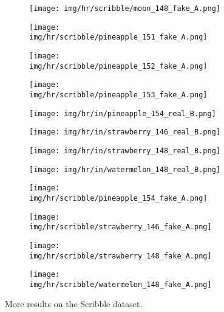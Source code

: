 \documentclass[10pt,twocolumn,letterpaper]{article}
\begin{document}
\begin{figure*}[tbp]
\begin{center}
\begin{subfigure}[b]{\hrwidth\linewidth}
  \texttt{[image: img/hr/scribble/moon\_148\_fake\_A.png]}
  \end{subfigure}
  \begin{subfigure}[b]{\hrwidth\linewidth}
  \texttt{[image: img/hr/scribble/pineapple\_151\_fake\_A.png]}
  \end{subfigure}
\begin{subfigure}[b]{\hrwidth\linewidth}
  \texttt{[image: img/hr/scribble/pineapple\_152\_fake\_A.png]}
  \end{subfigure}
  \begin{subfigure}[b]{\hrwidth\linewidth}
  \texttt{[image: img/hr/scribble/pineapple\_153\_fake\_A.png]}
  \end{subfigure}
  
\begin{subfigure}[b]{\hrwidth\linewidth}
  \texttt{[image: img/hr/in/pineapple\_154\_real\_B.png]}
  \end{subfigure}
  \begin{subfigure}[b]{\hrwidth\linewidth}
  \texttt{[image: img/hr/in/strawberry\_146\_real\_B.png]}
  \end{subfigure}
\begin{subfigure}[b]{\hrwidth\linewidth}
  \texttt{[image: img/hr/in/strawberry\_148\_real\_B.png]}
  \end{subfigure}
  \begin{subfigure}[b]{\hrwidth\linewidth}
  \texttt{[image: img/hr/in/watermelon\_148\_real\_B.png]}
  \end{subfigure}
  
\begin{subfigure}[b]{\hrwidth\linewidth}
  \texttt{[image: img/hr/scribble/pineapple\_154\_fake\_A.png]}
  \end{subfigure}
  \begin{subfigure}[b]{\hrwidth\linewidth}
  \texttt{[image: img/hr/scribble/strawberry\_146\_fake\_A.png]}
  \end{subfigure}
\begin{subfigure}[b]{\hrwidth\linewidth}
  \texttt{[image: img/hr/scribble/strawberry\_148\_fake\_A.png]}
  \end{subfigure}
  \begin{subfigure}[b]{\hrwidth\linewidth}
  \texttt{[image: img/hr/scribble/watermelon\_148\_fake\_A.png]}
  \end{subfigure}
  
\end{center}
\caption{More  results on the Scribble dataset.}
 \label{fig:hr_scribble}
\end{figure*}
\end{document}
